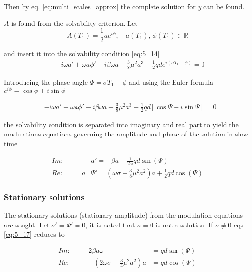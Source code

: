 Then by eq. \eqref{eq:multi_scales_approx} the complete solution for $y$ can be found.


$A$ is found from the solvability criterion. Let
\begin{equation}
  A(T_{1}) = \frac{1}{2} ae^{i\phi}, \quad a(T_{1}), \, \phi(T_{1}) \in \mathbb{R}
  \label{eq:A_modulation}
\end{equation}




and insert it into the solvability condition \eqref{eq:5_14}
\begin{align}
  \label{eq:5_15}
  &-i \omega a' + \omega a \phi' - i \beta \omega a - \frac{3}{8}\mu^2a^3 +
    \frac{1}{2}qd  e^{i (\sigma T_{1} - \phi)} = 0
\end{align}


Introducing the phase angle $\Psi = \sigma T_{1} - \phi$ and using the Euler
formula $e^{i \phi} = \cos\phi + i \sin \phi$

\begin{align}
  \label{eq:5_16}
  &-i \omega a' + \omega a \phi' - i \beta \omega a - \frac{3}{8}\mu^2a^3 +
    \frac{1}{2}qd \left[ \cos\Psi + i \sin \Psi \right]= 0
\end{align}

the solvability condition is separated into imaginary and real part to yield the
modulations equations governing the amplitude and phase of the solution in slow
time

\begin{equation}
  \label{eq:5_17}
  \begin{alignedat}{2}
    Im:& \quad & &a' = - \beta a + \frac{1}{2\omega} qd \sin(\Psi)  \\
    Re:& \quad & a&\Psi' = \left( \omega\sigma - \frac{3}{8} \mu^2a^2 \right)a +
    \frac{1}{2}qd\cos (\Psi)
  \end{alignedat}
\end{equation}

\subsubsection{Stationary solutions}
\label{sec:stationary-solutions}

The stationary solutions (stationary amplitude) from the modulation equations
are sought.  Let $a'=\Psi'=0$, it is noted that $a=0$ is not a solution.  If
$a \ne 0$ eqs.  \eqref{eq:5_17} reduces to


\begin{equation}
  \begin{alignedat}{2}
    Im:& \quad &  2\beta a \omega &= qd \sin(\Psi)  \\
    Re:& \quad & -\left( 2\omega\sigma - \frac{3}{4} \mu^2a^2 \right)a &= qd\cos(\Psi)
  \end{alignedat}  \label{eq:5_19}
\end{equation}

